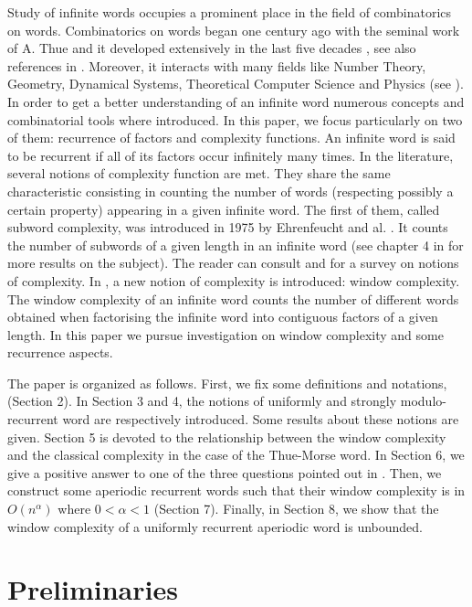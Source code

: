 \documentclass[a4 paper,12pt]{article}
\begin{document}
Study of infinite words occupies a prominent place in the field of combinatorics on words. Combinatorics on words began one century ago with the seminal work of A. Thue \cite{19, 20} and it developed extensively in the last five decades \cite{3, 5, 15, 18}, see also references in  \cite{7}. Moreover, it interacts with many fields like Number Theory, Geometry, Dynamical Systems,  Theoretical Computer Science and Physics  (see \cite{3, 5, 14}). In order to get a better  understanding of an infinite word numerous concepts and combinatorial tools where introduced. In this paper,  we focus particularly on two of them: recurrence of factors  and complexity functions. An infinite word is said to be recurrent if all of its factors occur infinitely many times. In the literature, several notions of complexity function are met. They  share the same characteristic  consisting in  counting the number of  words (respecting possibly a certain property) appearing in a given infinite word. The first of them, called subword complexity, was introduced in 1975 by Ehrenfeucht and al. \cite{10}. It counts the number of subwords of a given length in an infinite word (see chapter 4 in \cite{7} for more results on the subject). The reader can consult \cite{2} and \cite{8} for a survey on  notions of complexity. In \cite{9},   a new notion of complexity is introduced: window complexity. The window complexity of an infinite word counts the number of different words obtained when factorising the infinite word into contiguous factors of a given length. In this paper we pursue investigation on window complexity and some recurrence aspects.

The paper is organized as follows. First, we fix some definitions   and notations,  (Section 2). In Section 3 and 4, the notions of uniformly and strongly modulo-recurrent word are respectively introduced. Some results about these notions are given. Section 5 is devoted to the relationship between the window complexity and the classical complexity in the case of the Thue-Morse word. In Section 6, we give a positive answer to one of the three questions pointed out in \cite{9}. Then,  we construct some aperiodic recurrent words such that their window complexity is in $O(n^\alpha)$ where $0<\alpha<1$ (Section 7). Finally, in Section 8, we show that the window complexity of a uniformly recurrent aperiodic word is unbounded.

\section{Preliminaries}
\end{document}
